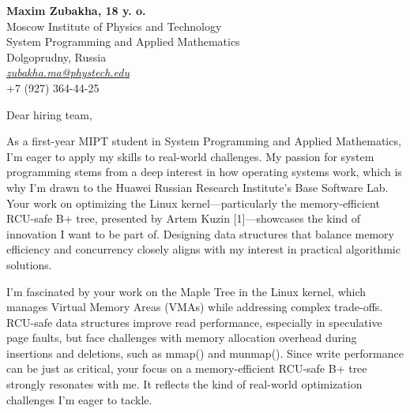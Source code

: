 \documentclass[11pt]{report}
\begin{document}
\begin{titlepage}

\begin{large}


\raggedright \textbf{Maxim Zubakha, 18 y. o.} \\ Moscow Institute of Physics and Technology \\ System Programming and Applied Mathematics \\ Dolgoprudny, Russia \\ \href{zubakha.ma@phystech.edu}{\textit{zubakha.ma@phystech.edu}} \\ +7 (927) 364-44-25 \\

\vspace{0.7em}

\raggedright Dear hiring team, \\

\vspace{0.7em}

As a first-year MIPT student in System Programming and Applied Mathematics, I’m eager to apply my skills to real-world challenges. My passion for system programming stems from a deep interest in how operating systems work, which is why I’m drawn to the Huawei Russian Research Institute’s Base Software Lab. Your work on optimizing the Linux kernel—particularly the memory-efficient RCU-safe B+ tree, presented by Artem Kuzin [1]—showcases the kind of innovation I want to be part of. Designing data structures that balance memory efficiency and concurrency closely aligns with my interest in practical algorithmic solutions.

\vspace{0.7em}

I’m fascinated by your work on the Maple Tree in the Linux kernel, which manages Virtual Memory Areas (VMAs) while addressing complex trade-offs. RCU-safe data structures improve read performance, especially in speculative page faults, but face challenges with memory allocation overhead during insertions and deletions, such as mmap() and munmap(). Since write performance can be just as critical, your focus on a memory-efficient RCU-safe B+ tree strongly resonates with me. It reflects the kind of real-world optimization challenges I’m eager to tackle.


\end{large}
\end{titlepage}
\end{document}

